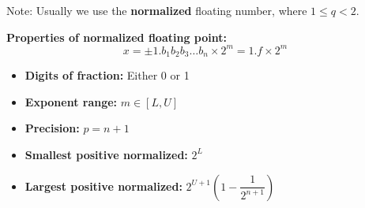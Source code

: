 \documentclass[12pt]{article}
\begin{document}
    Note: Usually we use the \textbf{normalized} floating number, where $1 \leq q < 2$.

\medskip
\noindent \textbf{Properties of normalized floating point:}
    $$x = \pm 1.b_1 b_2 b_3 \dots b_n \times 2^m = 1.f \times 2^m$$

    \begin{itemize}
        \item \textbf{Digits of fraction:} Either 0 or 1
        \item \textbf{Exponent range:} $m \in [L, U]$
        \item \textbf{Precision:} $p = n + 1$
        \item \textbf{Smallest positive normalized:} $2^L$
        \item \textbf{Largest positive normalized:} $2^{U+1} \left(1-\dfrac{1}{2^{n+1}} \right)$
    \end{itemize}
\end{document}
